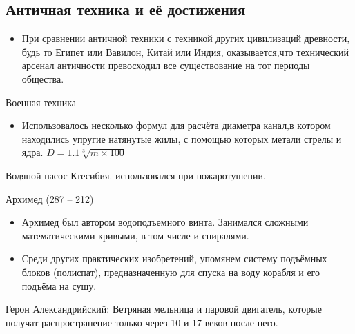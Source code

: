 \documentclass{book}
\theoremstyle{definition}
\begin{document}
    \subsection{Античная техника и её достижения}

    \begin{itemize}
        \item  При сравнении античной техники с техникой других цивилизаций древности, будь то Египет или Вавилон, Китай или Индия, оказывается,что технический арсенал античности превосходил все существование на тот периоды общества.
    \end{itemize}

    Военная техника
    \begin{itemize}
        \item Использовалось несколько формул для расчёта диаметра канал,в  котором находились упругие натянутые жилы, с помощью которых метали стрелы и ядра. $D = 1.1 \sqrt[3]{m\times 100} $
    \end{itemize}

    Водяной насос Ктесибия. использовался при пожаротушении.

    Архимед (287 -- 212)
    \begin{itemize}
        \item Архимед был автором водоподъемного винта. Занимался сложными математическими кривыми, в том числе и спиралями.
        \item Среди других практических изобретений, упомянем систему подъёмных блоков (полиспат), предназначенную для спуска на воду корабля и его подъёма на сушу.
    \end{itemize}

    Герон Александрийский: Ветряная мельница и паровой двигатель, которые получат распространение только через 10 и 17 веков после него.
\end{document}
